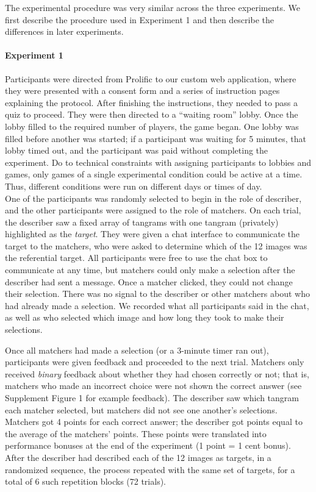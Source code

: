 \documentclass[
  english,
]{article}
\begin{document}
The experimental procedure was very similar across the three experiments.
We first describe the procedure used in Experiment 1 and then describe the differences in later experiments.

\paragraph{Experiment 1}

Participants were directed from Prolific to our custom web application, where they were presented with a consent form and a series of instruction pages explaining the protocol.
After finishing the instructions, they needed to pass a quiz to proceed.
They were then directed to a ``waiting room'' lobby.
Once the lobby filled to the required number of players, the game began. One lobby was filled before another was started; if a participant was waiting for 5 minutes, that lobby timed out, and the participant was paid without completing the experiment. Do to technical constraints with assigning participants to lobbies and games, only games of a single experimental condition could be active at a time. Thus, different conditions were run on different days or times of day.\\
One of the participants was randomly selected to begin in the role of describer, and the other participants were assigned to the role of matchers.
On each trial, the describer saw a fixed array of tangrams with one tangram (privately) highlighted as the \emph{target}.
They were given a chat interface to communicate the target to the matchers, who were asked to determine which of the 12 images was the referential target.
All participants were free to use the chat box to communicate at any time, but matchers could only make a selection after the describer had sent a message.
Once a matcher clicked, they could not change their selection.
There was no signal to the describer or other matchers about who had already made a selection.
We recorded what all participants said in the chat, as well as who selected which image and how long they took to make their selections.

Once all matchers had made a selection (or a 3-minute timer ran out), participants were given feedback and proceeded to the next trial.
Matchers only received \emph{binary} feedback about whether they had chosen correctly or not; that is, matchers who made an incorrect choice were not shown the correct answer (see Supplement Figure 1 for example feedback).
The describer saw which tangram each matcher selected, but matchers did not see one another's selections.
Matchers got 4 points for each correct answer; the describer got points equal to the average of the matchers' points.
These points were translated into performance bonuses at the end of the experiment (1 point = 1 cent bonus).
After the describer had described each of the 12 images as targets, in a randomized sequence, the process repeated with the same set of targets, for a total of 6 such repetition blocks (72 trials).
\end{document}
